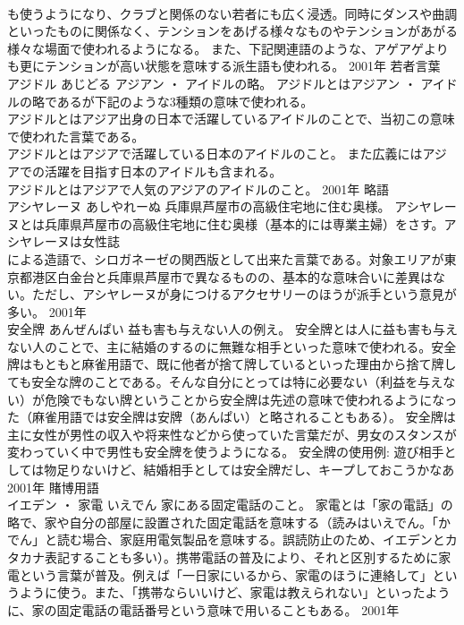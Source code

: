 \documentclass[8pt]{extreport}
\begin{document}
\begin{CJK}{UTF8}{min}
\\	も使うようになり、クラブと関係のない若者にも広く浸透。同時にダンスや曲調といったものに関係なく、テンションをあげる様々なものやテンションがあがる様々な場面で使われるようになる。 また、下記関連語のような、アゲアゲよりも更にテンションが高い状態を意味する派生語も使われる。	2001年	若者言葉	
\\	アジドル	あじどる	アジアン ・ アイドルの略。	アジドルとはアジアン ・ アイドルの略であるが下記のような3種類の意味で使われる。 
\\	アジドルとはアジア出身の日本で活躍しているアイドルのことで、当初この意味で使われた言葉である。 
\\	アジドルとはアジアで活躍している日本のアイドルのこと。 また広義にはアジアでの活躍を目指す日本のアイドルも含まれる。 
\\	アジドルとはアジアで人気のアジアのアイドルのこと。	2001年	略語	
\\	アシヤレーヌ	あしやれーぬ	兵庫県芦屋市の高級住宅地に住む奥様。	アシヤレーヌとは兵庫県芦屋市の高級住宅地に住む奥様（基本的には専業主婦）をさす。アシヤレーヌは女性誌
\\	による造語で、シロガネーゼの関西版として出来た言葉である。対象エリアが東京都港区白金台と兵庫県芦屋市で異なるものの、基本的な意味合いに差異はない。ただし、アシヤレーヌが身につけるアクセサリーのほうが派手という意見が多い。	2001年	
\\	安全牌	あんぜんぱい	益も害も与えない人の例え。	安全牌とは人に益も害も与えない人のことで、主に結婚のするのに無難な相手といった意味で使われる。安全牌はもともと麻雀用語で、既に他者が捨て牌しているといった理由から捨て牌しても安全な牌のことである。そんな自分にとっては特に必要ない（利益を与えない）が危険でもない牌ということから安全牌は先述の意味で使われるようになった（麻雀用語では安全牌は安牌（あんぱい）と略されることもある）。 安全牌は主に女性が男性の収入や将来性などから使っていた言葉だが、男女のスタンスが変わっていく中で男性も安全牌を使うようになる。 安全牌の使用例: 遊び相手としては物足りないけど、結婚相手としては安全牌だし、キープしておこうかなあ	2001年	賭博用語	
\\	イエデン ・ 家電	いえでん	家にある固定電話のこと。	家電とは「家の電話」の略で、家や自分の部屋に設置された固定電話を意味する（読みはいえでん。「かでん」と読む場合、家庭用電気製品を意味する。誤読防止のため、イエデンとカタカナ表記することも多い）。携帯電話の普及により、それと区別するために家電という言葉が普及。例えば「一日家にいるから、家電のほうに連絡して」というように使う。また、「携帯ならいいけど、家電は教えられない」といったように、家の固定電話の電話番号という意味で用いることもある。	2001年	

\end{CJK}
\end{document}
